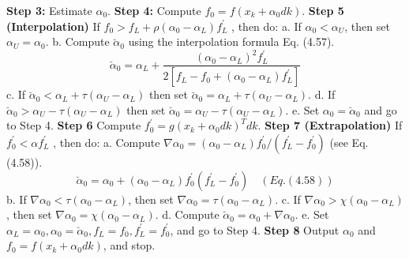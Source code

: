 \begin{multicols}{3}
\textbf{Step 3:} \newline
Estimate $\alpha_0$. \newline
\textbf{Step 4:} \newline
Compute $f_0 = f(x_k + \alpha_0dk)$. \newline
\textbf{Step 5 (Interpolation)} \newline
If $f_0 > f_L + \rho(\alpha_0 - \alpha_L)f_L^\prime$ , then do: \newline
a. If $\alpha_0 < \alpha_U$, then set $\alpha_U = \alpha_0$.\newline
b. Compute $\breve{\alpha}_0$ using the interpolation formula Eq. (4.57). %
\[
\breve{\alpha}_0 =\alpha_L + \frac{(\alpha_0-\alpha_L)^2f_L^\prime}{2[f_L-f_0+(\alpha_0-\alpha_L)f_L^\prime]}
\]
c. If $\breve{\alpha}_0 < \alpha_L + \tau(\alpha_U - \alpha_L)$ then set $\breve{\alpha}_0 = \alpha_L + \tau(\alpha_U - \alpha_L)$. \newline
d. If $\breve{\alpha}_0 > \alpha_U - \tau(\alpha_U - \alpha_L)$ then set $\breve{\alpha}_0  = \alpha_U - \tau(\alpha_U - \alpha_L)$. \newline
e. Set $\alpha_0 = \breve{\alpha}_0$ and go to Step 4. \newline
\textbf{Step 6} \newline
Compute $f_0^\prime = g(x_k + \alpha_0dk)^Tdk$. \newline
\textbf{Step 7 (Extrapolation)} \newline
If $f_0^\prime < \alpha f_L^\prime$ , then do: \newline
a. Compute $\nabla \alpha_0 = (\alpha_0 - \alpha_L)f_0^\prime /(f_L^\prime - f_0^\prime)$ (see Eq. (4.58)).
\[
\breve{\alpha}_0 = \alpha_0 + (\alpha_0 - \alpha_L)f_0^\prime
(f_L^\prime - f_0^\prime) \quad (Eq. (4.58))
\]
b. If $\nabla \alpha_0 < \tau(\alpha_0 - \alpha_L)$, then set $\nabla \alpha_0 = \tau(\alpha_0 - \alpha_L)$. \newline
c. If $\nabla \alpha_0 > \chi(\alpha_0 - \alpha_L)$, then set $\nabla \alpha_0 = \chi(\alpha_0 - \alpha_L)$. \newline
d. Compute $\breve{\alpha}_0 = \alpha_0 + \nabla \alpha_0$. \newline
e. Set $ \alpha_L =  \alpha_0, \alpha_0 = \breve{\alpha}_0, f_L = f_0, f_L^\prime = f_0^\prime$, and go to Step 4. \newline
\textbf{Step 8} \newline
Output $\alpha_0$ and $f_0 = f(x_k + \alpha_0dk)$, and stop.



\end{multicols}
